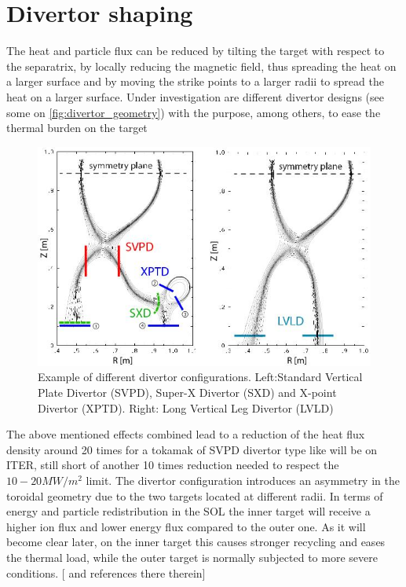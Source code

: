 \section{Divertor shaping}

The heat and particle flux can be reduced by tilting the target with respect to the separatrix, by locally reducing the magnetic field, thus spreading the heat on a larger surface and by moving the strike points to a larger radii to spread the heat on a larger surface.
Under investigation are different divertor designs (see some on \autoref{fig:divertor_geometry}) with the purpose, among others, to ease the thermal burden on the target

\begin{figure}[!ht]
	\centering
	\includegraphics[width=0.8\linewidth]{Chapters/chapter1/figs/divertor geometry.jpg}
	\caption{Example of different divertor configurations. Left:Standard Vertical Plate Divertor (SVPD), Super-X Divertor (SXD) and X-point Divertor (XPTD). Right: Long Vertical Leg Divertor (LVLD) \cite{Umansky2017}}
	\label{fig:divertor_geometry}
\end{figure}

The above mentioned effects combined lead to a reduction of the heat flux density around 20 times for a tokamak of SVPD divertor type like will be on ITER, still short of another 10 times reduction needed to respect the $10-20MW/m^2$ limit. The divertor configuration introduces an asymmetry in the toroidal geometry due to the two targets located at different radii. In terms of energy and particle redistribution in the SOL the inner target will receive a higher ion flux and lower energy flux compared to the outer one. As it will become clear later, on the inner target this causes stronger recycling and eases the thermal load, while the outer target is normally subjected to more severe conditions. [\cite{Potzel2014} and references there therein]

